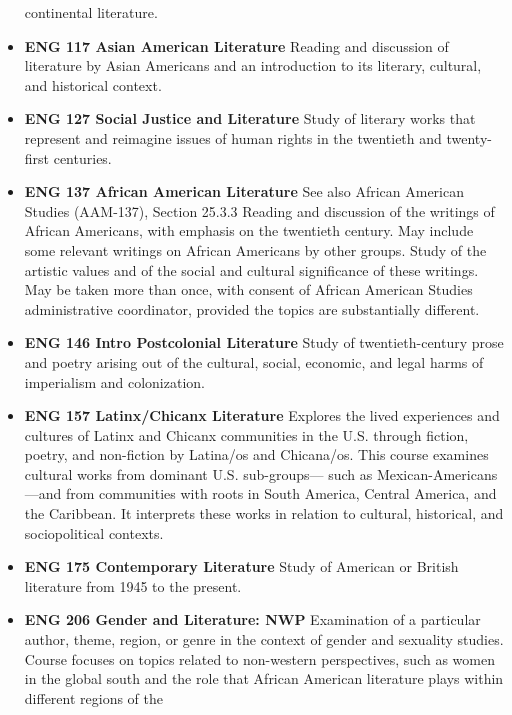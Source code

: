 \documentclass[
  letterpaper,
]{scrbook}
\begin{document}
\begin{itemize}
  continental literature.\\
\item
  \textbf{ENG 117 Asian American Literature} Reading and discussion of
  literature by Asian Americans and an introduction to its literary,
  cultural, and historical context.\\
\item
  \textbf{ENG 127 Social Justice and Literature} Study of literary works
  that represent and reimagine issues of human rights in the twentieth
  and twenty-first centuries.\\
\item
  \textbf{ENG 137 African American Literature} See also African American
  Studies (AAM-137), Section 25.3.3 Reading and discussion of the
  writings of African Americans, with emphasis on the twentieth century.
  May include some relevant writings on African Americans by other
  groups. Study of the artistic values and of the social and cultural
  significance of these writings. May be taken more than once, with
  consent of African American Studies administrative coordinator,
  provided the topics are substantially different.\\
\item
  \textbf{ENG 146 Intro Postcolonial Literature} Study of
  twentieth-century prose and poetry arising out of the cultural,
  social, economic, and legal harms of imperialism and colonization.\\
\item
  \textbf{ENG 157 Latinx/Chicanx Literature} Explores the lived
  experiences and cultures of Latinx and Chicanx communities in the U.S.
  through fiction, poetry, and non-fiction by Latina/os and Chicana/os.
  This course examines cultural works from dominant U.S. sub-groups---
  such as Mexican-Americans---and from communities with roots in South
  America, Central America, and the Caribbean. It interprets these works
  in relation to cultural, historical, and sociopolitical contexts.\\
\item
  \textbf{ENG 175 Contemporary Literature} Study of American or British
  literature from 1945 to the present.\\
\item
  \textbf{ENG 206 Gender and Literature: NWP} Examination of a
  particular author, theme, region, or genre in the context of gender
  and sexuality studies. Course focuses on topics related to non-western
  perspectives, such as women in the global south and the role that
  African American literature plays within different regions of the

\end{itemize}
\end{document}
